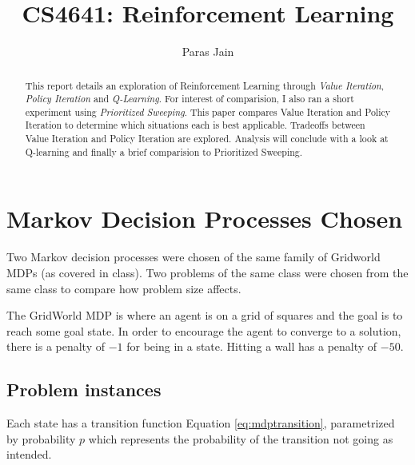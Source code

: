 \documentclass[11pt]{article}
\title{CS4641: Reinforcement Learning}
\author{Paras Jain}
\date{}
\begin{document}
\maketitle

\begin{abstract}
This report details an exploration of Reinforcement Learning through \textit{Value Iteration}, \textit{Policy Iteration} and \textit{Q-Learning}. For interest of comparision, I also ran a short experiment using \textit{Prioritized Sweeping}. This paper compares Value Iteration and Policy Iteration to determine which situations each is best applicable. Tradeoffs between Value Iteration and Policy Iteration are explored. Analysis will conclude with a look at Q-learning and finally a brief comparision to Prioritized Sweeping.
\end{abstract}


\section{Markov Decision Processes Chosen}
Two Markov decision processes were chosen of the same family of Gridworld MDPs (as covered in class). Two problems of the same class were chosen from the same class to compare how problem size affects.

The GridWorld MDP is where an agent is on a grid of squares and the goal is to reach some goal state. In order to encourage the agent to converge to a solution, there is a penalty of $-1$ for being in a state. Hitting a wall has a penalty of $-50$.

\subsection{Problem instances}



Each state has a transition function Equation \ref{eq:mdptransition}, parametrized by probability $p$ which represents the probability of the transition not going as intended.


\end{document}
